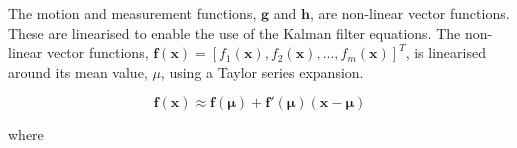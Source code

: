 The motion and measurement functions, $\mathbf{g}$ and $\mathbf{h}$, are non-linear vector functions.  These are linearised to enable the use of the Kalman filter equations. 
The non-linear vector functions, $\mathbf{f}(\mathbf{x}) = [f_1(\mathbf{x}),f_2(\mathbf{x}),...,f_m(\mathbf{x})]^T$, is linearised around its mean value, $\mu$, using
a Taylor series expansion.

\begin{equation}
    \mathbf{f}(\mathbf{x}) \approx \mathbf{f}(\boldsymbol{\mu}) + \mathbf{f}'(\boldsymbol{\mu})(\mathbf{x}-\boldsymbol{\mu})
\end{equation}

where



\label{sec:statesystemmodel}

\label{sec:statemotionmodel}



\label{sec:statemeasuremtmodel}

\label{sec:statessimulation}

\label{sec:statepracticalconsiderations}

\label{sec:statenof}

\label{sec:stateoutliers}

\label{sec:stateconclusion}